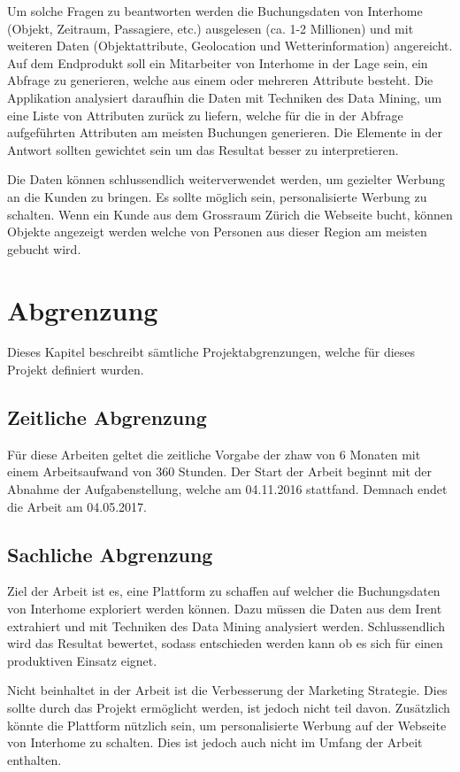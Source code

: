 Um solche Fragen zu beantworten werden die Buchungsdaten von Interhome (Objekt, Zeitraum, Passagiere, etc.) ausgelesen (ca. 1-2 Millionen) und mit weiteren Daten (Objektattribute, Geolocation und Wetterinformation) angereicht. 
Auf dem Endprodukt soll ein Mitarbeiter von Interhome in der Lage sein, ein Abfrage zu generieren, welche aus einem oder mehreren Attribute besteht. Die Applikation analysiert daraufhin die Daten mit Techniken des Data Mining, um eine Liste von Attributen zurück zu liefern, welche für die in der Abfrage aufgeführten Attributen am meisten Buchungen generieren. Die Elemente in der Antwort sollten gewichtet sein um das Resultat besser zu interpretieren.

Die Daten können schlussendlich weiterverwendet werden, um gezielter Werbung an die Kunden zu bringen. Es sollte möglich sein, personalisierte Werbung zu schalten. Wenn ein Kunde aus dem Grossraum Zürich die Webseite bucht, können Objekte angezeigt werden welche von Personen aus dieser Region am meisten gebucht wird. 

\section{Abgrenzung}
Dieses Kapitel beschreibt sämtliche Projektabgrenzungen, welche für dieses Projekt definiert
wurden.

\subsection{Zeitliche Abgrenzung}
Für diese Arbeiten geltet die zeitliche Vorgabe der \gls{zhaw} von 6 Monaten mit einem Arbeitsaufwand von 360 Stunden.
Der Start der Arbeit beginnt mit der Abnahme der Aufgabenstellung, welche am 04.11.2016 stattfand.
Demnach endet die Arbeit am 04.05.2017.

\subsection{Sachliche Abgrenzung}
Ziel der Arbeit ist es, eine Plattform zu schaffen auf welcher die Buchungsdaten von Interhome exploriert werden können. Dazu müssen die Daten aus dem Irent extrahiert und mit Techniken des Data Mining analysiert werden. Schlussendlich wird das Resultat bewertet, sodass entschieden werden kann ob es sich für einen produktiven Einsatz eignet.

Nicht beinhaltet in der Arbeit ist die Verbesserung der Marketing Strategie. Dies sollte durch das Projekt ermöglicht werden, ist jedoch nicht teil davon. Zusätzlich könnte die Plattform nützlich sein, um personalisierte Werbung auf der Webseite von Interhome zu schalten. Dies ist jedoch auch nicht im Umfang der Arbeit enthalten.

